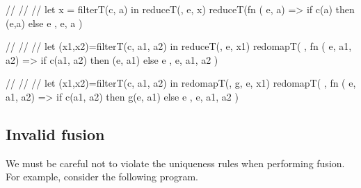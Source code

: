 \begin{center}
\begin{bcolorcode}
//
//
//
let x = filterT(c, a)
in  reduceT(\mymath{\oplus}, e, x)
    \emphh{\mymath{\Downarrow}}
reduceT(fn \mymath{\beta} (\mymath{\beta} e, \mymath{\beta} a) =>
  if c(a) then \mymath{\oplus}(e,a) else e
, e, a )
\end{bcolorcode}
\end{center}

\begin{center}
\begin{bcolorcode}
//
//
//
let (x1,x2)=filterT(c, a1, a2)
in  reduceT(\mymath{\oplus}, e, x1)
    \emphh{\mymath{\Downarrow}}
redomapT(\mymath{\oplus}
, fn \mymath{\beta} (\mymath{\beta} e,  a1,  a2)
   => if c(a1, a2)
      then \mymath{\oplus}(e, a1) else e
, e, a1, a2 )
\end{bcolorcode}
\end{center}

\begin{center}
\begin{bcolorcode}
//
//
//
let (x1,x2)=filterT(c, a1, a2)
in  redomapT(\mymath{\oplus}, g, e, x1)
    \emphh{\mymath{\Downarrow}}
redomapT(\mymath{\oplus}
, fn \mymath{\beta} (\mymath{\beta} e,  a1,  a2)
   => if c(a1, a2)
      then g(e, a1) else e
, e, a1, a2 )
\end{bcolorcode}
\end{center}

\subsection{Invalid fusion}
\label{sec:invalidfusion}

We must be careful not to violate the uniqueness rules when performing
fusion.  For example, consider the following program.

